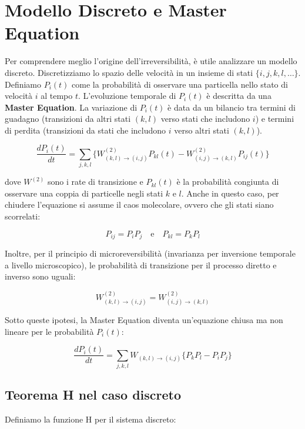 \section{Modello Discreto e Master Equation}
Per comprendere meglio l'origine dell'irreversibilità, è utile analizzare un modello discreto. Discretizziamo lo spazio delle velocità in un insieme di stati $\{i, j, k, l, \dots\}$.
Definiamo $P_i(t)$ come la probabilità di osservare una particella nello stato di velocità $i$ al tempo $t$. L'evoluzione temporale di $P_i(t)$ è descritta da una \textbf{Master Equation}. La variazione di $P_i(t)$ è data da un bilancio tra termini di guadagno (transizioni da altri stati $(k,l)$ verso stati che includono $i$) e termini di perdita (transizioni da stati che includono $i$ verso altri stati $(k,l)$).

\begin{equation}
\frac{dP_i(t)}{dt} = \sum_{j,k,l} \{ W_{(k,l)\to(i,j)}^{(2)} P_{kl}(t) - W_{(i,j)\to(k,l)}^{(2)} P_{ij}(t) \}
\end{equation}

dove $W^{(2)}$ sono i rate di transizione e $P_{kl}(t)$ è la probabilità congiunta di osservare una coppia di particelle negli stati $k$ e $l$.
Anche in questo caso, per chiudere l'equazione si assume il caos molecolare, ovvero che gli stati siano scorrelati:

\begin{equation}
P_{ij} = P_i P_j \quad \text{e} \quad P_{kl} = P_k P_l
\end{equation}

Inoltre, per il principio di microreversibilità (invarianza per inversione temporale a livello microscopico), le probabilità di transizione per il processo diretto e inverso sono uguali:

\begin{equation}
W_{(k,l)\to(i,j)}^{(2)} = W_{(i,j)\to(k,l)}^{(2)}
\end{equation}

Sotto queste ipotesi, la Master Equation diventa un'equazione chiusa ma non lineare per le probabilità $P_i(t)$:

\begin{equation}
\frac{dP_i(t)}{dt} = \sum_{j,k,l} W_{(k,l)\to(i,j)} \{ P_k P_l - P_i P_j \}
\end{equation}

\subsection{Teorema H nel caso discreto}
Definiamo la funzione H per il sistema discreto:


